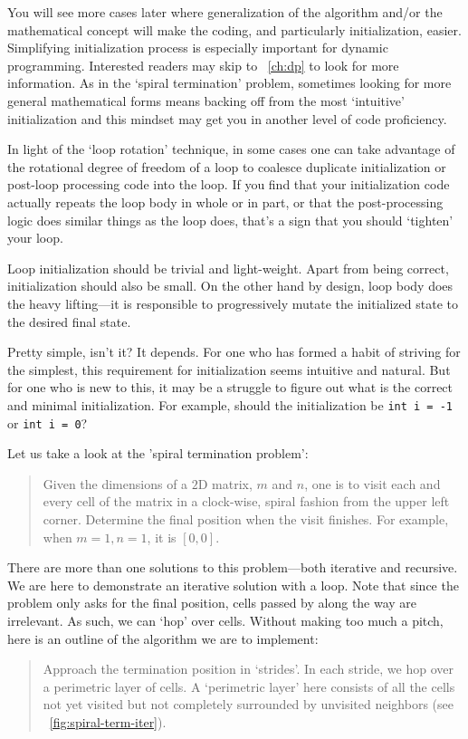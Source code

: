 \documentclass[oneside,11pt]{book}
\theoremstyle{definition}
\theoremstyle{remark}
\newcommand{\code}[1]{\mbox{\lstinline{#1}}}
\begin{document}
You will see more cases later where generalization of the algorithm and/or the mathematical
concept will make the coding, and particularly initialization, easier.
Simplifying initialization process is especially important for dynamic programming.
Interested readers may skip to ~\autoref{ch:dp} to look for more information.
As in the `spiral termination' problem, sometimes looking for more general mathematical forms
means backing off from the most `intuitive' initialization and this mindset may get you in another
level of code proficiency.


In light of the `loop rotation' technique, in some cases one can take advantage of the rotational
degree of freedom of a loop to coalesce duplicate initialization
or post-loop processing code into the loop.
If you find that your initialization code actually repeats the loop body in whole or in part,
or that the post-processing logic does similar things as the loop does,
that's a sign that you should `tighten' your loop.


Loop initialization should be trivial and light-weight.
Apart from being correct, initialization should also be small.
On the other hand by design, loop body does the heavy lifting---it is responsible to progressively
mutate the initialized state to the desired final state.


Pretty simple, isn't it?
It depends.
For one who has formed a habit of striving for the simplest,
this requirement for initialization seems intuitive and natural.
But for one who is new to this, it may be a struggle
to figure out what is the correct and minimal initialization.
For example, should the initialization be \code{int i = -1} or \code{int i = 0}?


Let us take a look at the 'spiral termination problem':
\begin{quote}
    Given the dimensions of a $2$D matrix, $m$ and $n$,
    one is to visit each and every cell of the matrix in
    a clock-wise, spiral fashion from the upper left corner.
    Determine the final position when the visit finishes.
    For example, when $m=1,n=1$, it is $[0,0]$.
\end{quote}


There are more than one solutions to this problem---both iterative and recursive.
We are here to demonstrate an iterative solution with a loop.
Note that since the problem only asks for the final position,
cells passed by along the way are irrelevant.
As such, we can `hop' over cells.
Without making too much a pitch, here is an outline of the algorithm we are to implement:
\begin{quote}
    Approach the termination position in `strides'.
    In each stride, we hop over a perimetric layer of cells.
    A `perimetric layer' here consists of all the cells not yet visited but not completely
    surrounded by unvisited neighbors (see ~\autoref{fig:spiral-term-iter}).
\end{quote}
\end{document}

